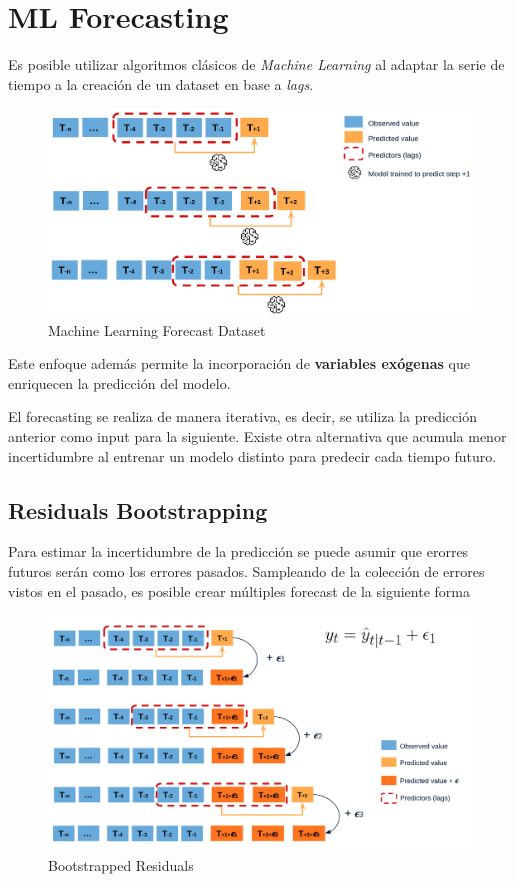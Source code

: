 \section{ML Forecasting}

Es posible utilizar algoritmos clásicos de \textit{Machine Learning} al adaptar la serie de tiempo a la creación de un dataset en base a \textit{lags}. 

\begin{figure}[H]
    \center
    \includegraphics[scale=0.15]{notebooks/TS/img/ml_forecast.png}
    \caption{Machine Learning Forecast Dataset}
\end{figure}

Este enfoque además permite la incorporación de \textbf{variables exógenas} que enriquecen la predicción del modelo.

El forecasting se realiza de manera iterativa, es decir, se utiliza la predicción anterior como input para la siguiente. Existe otra alternativa que acumula menor incertidumbre al entrenar un modelo distinto para predecir cada tiempo futuro.

\subsection{Residuals Bootstrapping}

Para estimar la incertidumbre de la predicción se puede asumir que erorres futuros serán como los errores pasados. Sampleando de la colección de errores vistos en el pasado, es posible crear múltiples forecast de la siguiente forma 

\begin{figure}[H]
    \center
    \includegraphics[scale=0.16]{notebooks/TS/img/boostrapped_residuals.png}
    \caption{Bootstrapped Residuals}
\end{figure}

